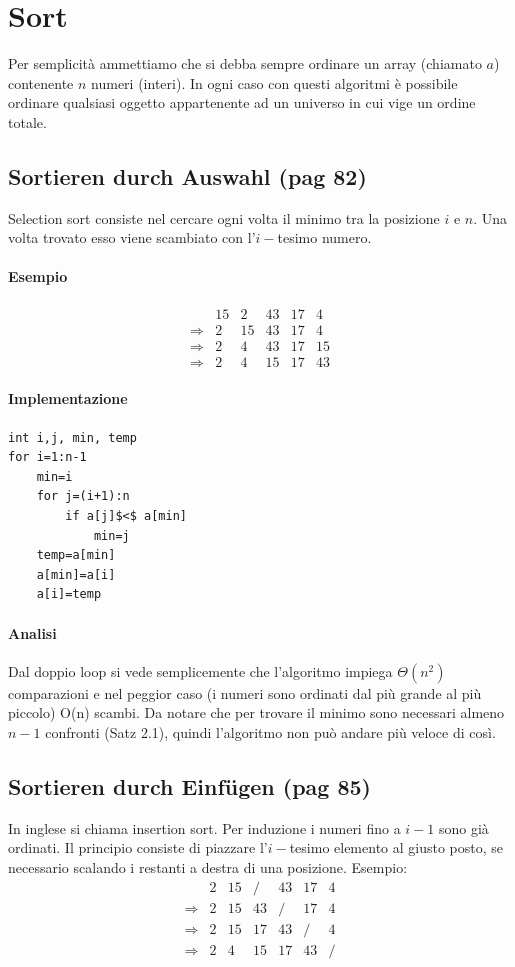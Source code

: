 \documentclass[a4paper]{book}
\begin{document}
\chapter{Sort}
Per semplicità ammettiamo che si debba sempre ordinare un array (chiamato $a$) contenente $n$ numeri (interi). In ogni caso con questi algoritmi è possibile ordinare qualsiasi oggetto appartenente ad un universo in cui vige un ordine totale.
\section{Sortieren durch Auswahl (pag 82)}
Selection sort consiste nel cercare ogni volta il minimo tra la posizione $i$ e $n$. Una volta trovato esso viene scambiato con l'$i-$tesimo numero. 
\subsubsection*{Esempio}
\[\begin{array}{*{20}{c}}
{}&{15}&2&{43}&{17}&4\\
{\Rightarrow}&2&{15}&{43}&{17}&4\\
{\Rightarrow}&2&4&{43}&{17}&{15}\\
{\Rightarrow}&2&4&{15}&{17}&{43}
\end{array}\]
\subsubsection*{Implementazione}
\begin{lstlisting}
int i,j, min, temp
for i=1:n-1
	min=i
	for j=(i+1):n
		if a[j]$<$ a[min]
			min=j
	temp=a[min]
	a[min]=a[i]
	a[i]=temp
\end{lstlisting}
\subsubsection*{Analisi}

Dal doppio loop si vede semplicemente che l'algoritmo impiega $\Theta (n^2)$ comparazioni e nel peggior caso (i numeri sono ordinati dal più grande al più piccolo) O(n) scambi. Da notare che per trovare il minimo sono necessari almeno $n-1$ confronti (Satz 2.1), quindi l'algoritmo non può andare più veloce di così. 
\section{Sortieren durch Einfügen (pag 85)}
In inglese si chiama insertion sort. Per induzione i numeri fino a $i-1$ sono già ordinati. Il principio consiste di piazzare l'$i-$tesimo elemento al giusto posto, se necessario scalando i restanti a destra di una posizione. Esempio:
\[\begin{array}{*{20}{c}}
{}&2&{15}&/&{43}&{17}&4\\
{\Rightarrow}&2&{15}&{43}&/&{17}&4\\
{\Rightarrow}&2&{15}&{17}&{43}&/&4\\
{\Rightarrow}&2&4&{15}&{17}&{43}&/
\end{array}\]
\end{document}
